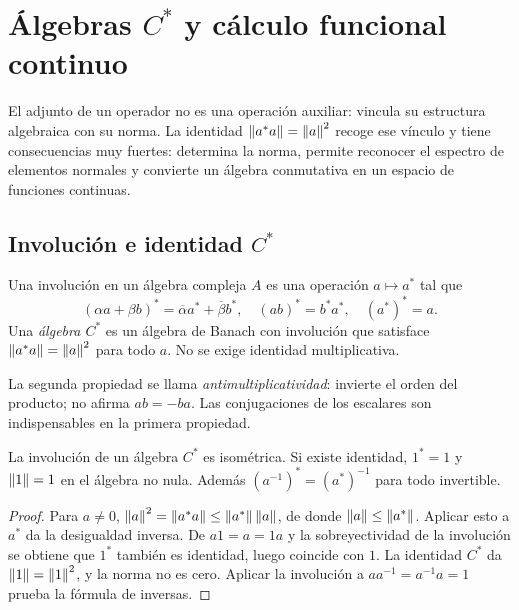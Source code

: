 \chapter{Álgebras \texorpdfstring{$C^*$}{C*} y cálculo funcional continuo}\label{cap:v3-13}

El adjunto de un operador no es una operación auxiliar: vincula su estructura algebraica con su norma. La identidad $\left\lVert a^*a\right\rVert=\left\lVert a\right\rVert^2$ recoge ese vínculo y tiene consecuencias muy fuertes: determina la norma, permite reconocer el espectro de elementos normales y convierte un álgebra conmutativa en un espacio de funciones continuas.

\section{Involución e identidad \texorpdfstring{$C^*$}{C*}}\label{lec:v3-25}

\begin{definicion}
Una involución en un álgebra compleja $A$ es una operación $a\mapsto a^*$ tal que
\[
 (\alpha a+\beta b)^*=\overline\alpha a^*+\overline\beta b^*,\quad
 (ab)^*=b^*a^*,\quad (a^*)^*=a.
\]
Una \emph{álgebra $C^*$} es un álgebra de Banach con involución que satisface $\left\lVert a^*a\right\rVert=\left\lVert a\right\rVert^2$ para todo $a$. No se exige identidad multiplicativa.
\end{definicion}

La segunda propiedad se llama \emph{antimultiplicatividad}: invierte el orden del producto; no afirma $ab=-ba$. Las conjugaciones de los escalares son indispensables en la primera propiedad.

\begin{proposicion}\label{v3:involucion-isometrica}
La involución de un álgebra $C^*$ es isométrica. Si existe identidad, $1^*=1$ y $\left\lVert1\right\rVert=1$ en el álgebra no nula. Además $(a^{-1})^*=(a^*)^{-1}$ para todo invertible.
\end{proposicion}
\begin{proof}
Para $a\ne0$, $\left\lVert a\right\rVert^2=\left\lVert a^*a\right\rVert\le\left\lVert a^*\right\rVert\left\lVert a\right\rVert$, de donde $\left\lVert a\right\rVert\le\left\lVert a^*\right\rVert$. Aplicar esto a $a^*$ da la desigualdad inversa. De $a1=a=1a$ y la sobreyectividad de la involución se obtiene que $1^*$ también es identidad, luego coincide con $1$. La identidad $C^*$ da $\left\lVert1\right\rVert=\left\lVert1\right\rVert^2$, y la norma no es cero. Aplicar la involución a $aa^{-1}=a^{-1}a=1$ prueba la fórmula de inversas.
\end{proof}

